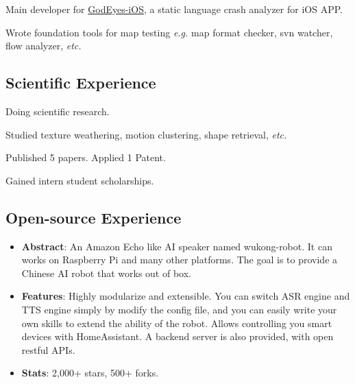 {
\begin{tightitemize}%
 \item Main developer for \href{http://godeyes.duapp.com}{GodEyes-iOS}, a static
   language crash analyzer for iOS APP. 
 \item Wrote foundation tools for
   map testing \textsl{e.g.} map format checker, svn
   watcher, flow analyzer, \textsl{etc.}
 \end{tightitemize}}

\subsection{Scientific Experience}

{Doing scientific research.
\begin{tightitemize}%
 \item Studied texture weathering, motion clustering, shape retrieval, \textsl{etc.}
 \item Published 5 papers. Applied 1 Patent.
 \item Gained intern student scholarships. 
 \end{tightitemize}}

\subsection{Open-source Experience}

%
  {
\begin{itemize}
\item \textbf{Abstract}: An Amazon Echo like AI speaker named wukong-robot. It can works on Raspberry Pi and many other platforms. The goal is to provide a Chinese AI robot that works out of box.
\item \textbf{Features}: Highly modularize and extensible. You can switch ASR engine and TTS engine simply by modify the config file, and you can easily write your own skills to extend the ability of the robot. Allows controlling you smart devices with HomeAssistant. A backend server is also provided, with open restful APIs.
\item \textbf{Stats}: 2,000+ stars, 500+ forks.
\end{itemize}}

